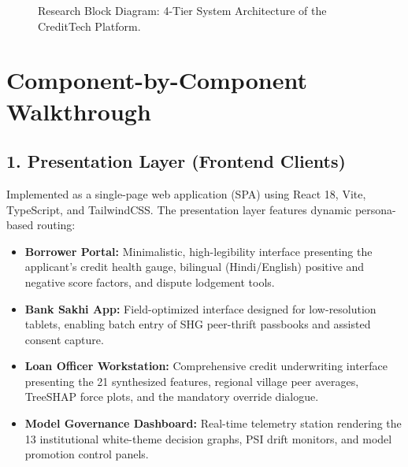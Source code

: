 \begin{figure}[H]
\begin{tikzpicture}[
  scale=0.86, every node/.style={transform shape},
  node distance=1.0cm and 0.5cm, auto
]
\end{tikzpicture}
\caption{Research Block Diagram: 4-Tier System Architecture of the CreditTech Platform.}
\label{fig:system_architecture_diagram}
\end{figure}

\section{Component-by-Component Walkthrough}

\subsection{1. Presentation Layer (Frontend Clients)}
Implemented as a single-page web application (SPA) using React 18, Vite, TypeScript, and TailwindCSS. The presentation layer features dynamic persona-based routing:
\begin{itemize}
  \item \textbf{Borrower Portal:} Minimalistic, high-legibility interface presenting the applicant's credit health gauge, bilingual (Hindi/English) positive and negative score factors, and dispute lodgement tools.
  \item \textbf{Bank Sakhi App:} Field-optimized interface designed for low-resolution tablets, enabling batch entry of SHG peer-thrift passbooks and assisted consent capture.
  \item \textbf{Loan Officer Workstation:} Comprehensive credit underwriting interface presenting the 21 synthesized features, regional village peer averages, TreeSHAP force plots, and the mandatory override dialogue.
  \item \textbf{Model Governance Dashboard:} Real-time telemetry station rendering the 13 institutional white-theme decision graphs, PSI drift monitors, and model promotion control panels.
\end{itemize}

